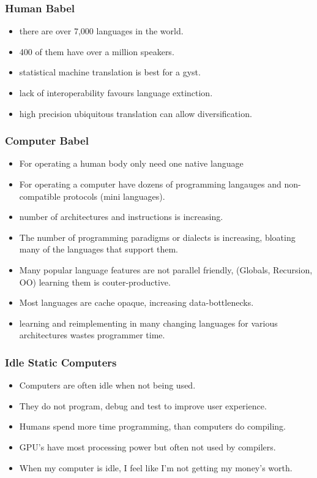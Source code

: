 \documentclass{beamer}
\begin{document}
\begin{frame}
  \frametitle{Human Babel}
  \begin{itemize}
    \item there are over 7,000 languages in the world.
    \item 400 of them have over a million speakers. 
    \item statistical machine translation is best for a gyst.
    \item lack of interoperability favours language extinction. 
    \item high precision ubiquitous translation can allow diversification.
  \end{itemize}
\end{frame}

\begin{frame}
  \frametitle{Computer Babel}
  \begin{itemize}
    \item For operating a human body only need one native language
    \item For operating a computer have dozens of programming langauges
          and non-compatible protocols (mini languages).
    \item number of architectures and instructions is increasing. 
    \item The number of programming paradigms or dialects is increasing,
          bloating many of the languages that support them.
    \item Many popular language features are not parallel friendly,
          (Globals, Recursion, OO) learning them is couter-productive.
    \item Most languages are cache opaque, increasing data-bottlenecks.
    \item learning and reimplementing in  many changing languages 
          for various architectures wastes programmer time. 
  \end{itemize}
\end{frame}

\begin{frame}
  \frametitle{Idle Static Computers}
  \begin{itemize}
    \item Computers are often idle when not being used. 
    \item They do not program, debug and test to improve user experience. 
    \item Humans spend more time programming, than computers do compiling. 
    \item GPU's have most processing power but often not used by compilers.
    \item When my computer is idle, I feel like I'm not getting my money's worth.
  \end{itemize}
\end{frame}
\end{document}
